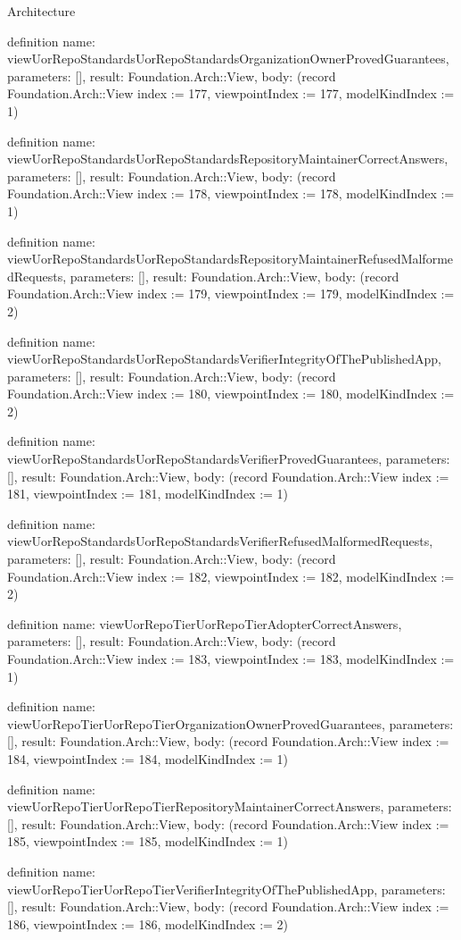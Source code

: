 \begin{lexlean}{Architecture}
\begin{semanticmodule}
definition{
  name: viewUorRepoStandardsUorRepoStandardsOrganizationOwnerProvedGuarantees,
  parameters: [],
  result: Foundation.Arch::View,
  body: (record Foundation.Arch::View {index := 177, viewpointIndex := 177, modelKindIndex := 1})
}

definition{
  name: viewUorRepoStandardsUorRepoStandardsRepositoryMaintainerCorrectAnswers,
  parameters: [],
  result: Foundation.Arch::View,
  body: (record Foundation.Arch::View {index := 178, viewpointIndex := 178, modelKindIndex := 1})
}

definition{
  name: viewUorRepoStandardsUorRepoStandardsRepositoryMaintainerRefusedMalformedRequests,
  parameters: [],
  result: Foundation.Arch::View,
  body: (record Foundation.Arch::View {index := 179, viewpointIndex := 179, modelKindIndex := 2})
}

definition{
  name: viewUorRepoStandardsUorRepoStandardsVerifierIntegrityOfThePublishedApp,
  parameters: [],
  result: Foundation.Arch::View,
  body: (record Foundation.Arch::View {index := 180, viewpointIndex := 180, modelKindIndex := 2})
}

definition{
  name: viewUorRepoStandardsUorRepoStandardsVerifierProvedGuarantees,
  parameters: [],
  result: Foundation.Arch::View,
  body: (record Foundation.Arch::View {index := 181, viewpointIndex := 181, modelKindIndex := 1})
}

definition{
  name: viewUorRepoStandardsUorRepoStandardsVerifierRefusedMalformedRequests,
  parameters: [],
  result: Foundation.Arch::View,
  body: (record Foundation.Arch::View {index := 182, viewpointIndex := 182, modelKindIndex := 2})
}

definition{
  name: viewUorRepoTierUorRepoTierAdopterCorrectAnswers,
  parameters: [],
  result: Foundation.Arch::View,
  body: (record Foundation.Arch::View {index := 183, viewpointIndex := 183, modelKindIndex := 1})
}

definition{
  name: viewUorRepoTierUorRepoTierOrganizationOwnerProvedGuarantees,
  parameters: [],
  result: Foundation.Arch::View,
  body: (record Foundation.Arch::View {index := 184, viewpointIndex := 184, modelKindIndex := 1})
}

definition{
  name: viewUorRepoTierUorRepoTierRepositoryMaintainerCorrectAnswers,
  parameters: [],
  result: Foundation.Arch::View,
  body: (record Foundation.Arch::View {index := 185, viewpointIndex := 185, modelKindIndex := 1})
}

definition{
  name: viewUorRepoTierUorRepoTierVerifierIntegrityOfThePublishedApp,
  parameters: [],
  result: Foundation.Arch::View,
  body: (record Foundation.Arch::View {index := 186, viewpointIndex := 186, modelKindIndex := 2})
}


\end{semanticmodule}
\end{lexlean}
